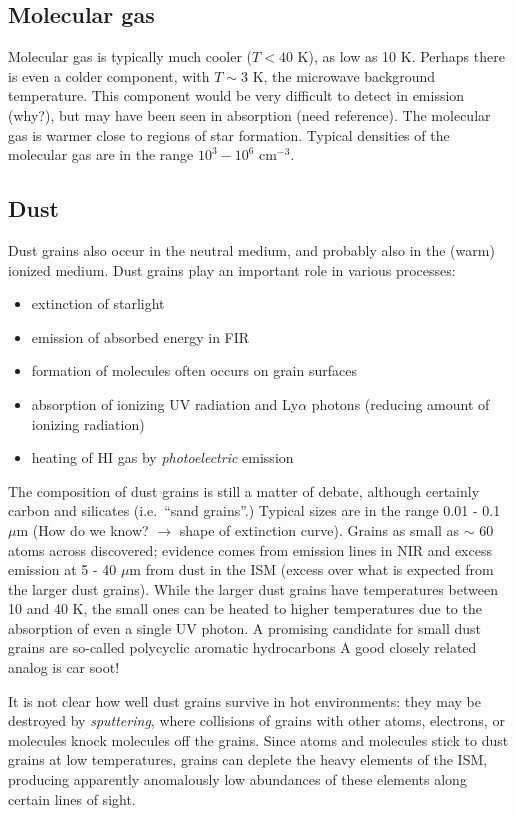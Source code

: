 \documentclass[11pt]{article}
\newcommand{\mar}[1]{\hspace{0pt}\marginpar{-\textcolor{black}{#1}-}}
\begin{document}
\subsection{Molecular gas}
Molecular gas is typically much cooler ($T < 40$ K), as low as 10 K.
Perhaps there is even a colder component, with $T \sim 3$ K, the microwave
background temperature. This component would be very difficult to detect
in emission (why?), but may have been seen in absorption (need reference).
The molecular gas is warmer close to regions of star formation. Typical
densities of the molecular gas are in the range $10^{3} - 10^{6}$ cm$^{-3}$.

\subsection{Dust}
\mar{8}Dust grains also occur in the neutral medium, and
probably also in the (warm) ionized medium. Dust grains play an important
role in various processes:
\begin{itemize}
    \item extinction of starlight
    \item emission of absorbed energy in FIR
    \item formation of molecules often occurs on grain surfaces
    \item absorption of ionizing UV radiation and Ly$\alpha$ photons
        (reducing amount of ionizing radiation)
    \item heating of HI gas by \emph{photoelectric} emission
\end{itemize}
The composition of dust grains is still a matter of debate, although certainly
carbon and silicates (i.e.\ ``sand grains''.) Typical sizes are in the range
0.01 - 0.1 $\mu$m (How do we know? $\rightarrow$ shape of extinction curve).
Grains as small as $\sim$ 60 atoms across discovered; evidence comes from
emission lines in NIR and excess emission at 5 - 40 $\mu$m from dust in the ISM
(excess over what is expected from the larger dust grains). While the larger
dust grains have temperatures between 10 and 40 K, the small ones can be heated
to higher temperatures due to the absorption of even a single UV photon. A
promising candidate for small dust grains are so-called polycyclic aromatic
hydrocarbons A good closely related analog is car soot!

It is not clear how well dust grains survive in hot environments: they may be
destroyed by \textit{sputtering}, where collisions of grains with other atoms,
electrons, or molecules knock molecules off the grains.
\mar{9}Since atoms and molecules stick to dust grains at low temperatures,
grains can deplete the heavy elements
of the ISM, producing apparently anomalously low abundances of these elements
along certain lines of sight.
\end{document}
